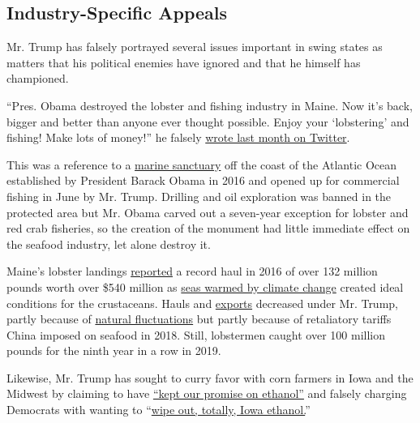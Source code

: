 \hypertarget{industry-specific-appeals}{%
\subsection{Industry-Specific Appeals}\label{industry-specific-appeals}}

Mr. Trump has falsely portrayed several issues important in swing states
as matters that his political enemies have ignored and that he himself
has championed.

``Pres. Obama destroyed the lobster and fishing industry in Maine. Now
it's back, bigger and better than anyone ever thought possible. Enjoy
your `lobstering' and fishing! Make lots of money!'' he falsely
\href{https://twitter.com/realDonaldTrump/status/1275951862269829121}{wrote
last month on Twitter}.

This was a reference to a
\href{https://www.nytimes3xbfgragh.onion/2016/09/16/us/politics/obama-to-create-atlantic-oceans-first-marine-monument.html}{marine
sanctuary} off the coast of the Atlantic Ocean established by President
Barack Obama in 2016 and opened up for commercial fishing in June by Mr.
Trump. Drilling and oil exploration was banned in the protected area but
Mr. Obama carved out a seven-year exception for lobster and red crab
fisheries, so the creation of the monument had little immediate effect
on the seafood industry, let alone destroy it.

Maine's lobster landings
\href{https://www.maine.gov/dmr/commercial-fishing/landings/documents/lobster.table.pdf}{reported}
a record haul in 2016 of over 132 million pounds worth over \$540
million as
\href{https://www.nytimes3xbfgragh.onion/2018/06/21/climate/maine-lobsters.html}{seas
warmed by climate change} created ideal conditions for the crustaceans.
Hauls and
\href{https://www.st.nmfs.noaa.gov/apex/f?p=213:19:15297671813997::NO:::}{exports}
decreased under Mr. Trump, partly because of
\href{https://www.pressherald.com/2020/03/06/lobster-harvest-smallest-in-9-years-but-value-increased/}{natural
fluctuations} but partly because of retaliatory tariffs China imposed on
seafood in 2018. Still, lobstermen caught over 100 million pounds for
the ninth year in a row in 2019.

Likewise, Mr. Trump has sought to curry favor with corn farmers in Iowa
and the Midwest by claiming to have
\href{https://www.whitehouse.gov/briefings-statements/remarks-president-trump-supporting-nations-farmers-ranchers-food-supply-chain/}{``kept
our promise on ethanol''} and falsely charging Democrats with wanting to
``\href{https://www.c-span.org/video/?468452-1/president-trump-rally-des-moines-iowa}{wipe
out, totally, Iowa ethanol.}''

